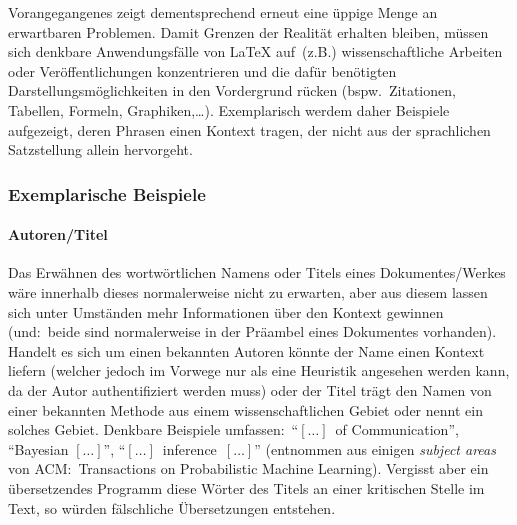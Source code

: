 Vorangegangenes zeigt dementsprechend erneut eine üppige Menge an erwartbaren Problemen. Damit Grenzen der Realität erhalten bleiben, %
müssen sich denkbare Anwendungsfälle von \LaTeX{} auf\ (z.B.) wissenschaftliche Arbeiten oder Veröffentlichungen konzentrieren und die dafür benötigten Darstellungsmöglichkeiten in den Vordergrund rücken (bspw.\ Zitationen, Tabellen, Formeln, Graphiken,\ldots).%
Exemplarisch werdem daher Beispiele aufgezeigt, deren Phrasen einen Kontext tragen, der nicht aus der sprachlichen Satzstellung allein hervorgeht. 



\subsubsection{Exemplarische Beispiele}
\paragraph*{Autoren/Titel}%
%
%
%
Das Erwähnen des wortwörtlichen Namens oder Titels eines Dokumentes/Werkes wäre innerhalb dieses normalerweise nicht zu erwarten, aber aus diesem lassen sich unter Umständen mehr Informationen über den Kontext gewinnen (und:\ beide sind normalerweise in der Präambel eines Dokumentes vorhanden). Handelt es sich um einen bekannten Autoren könnte der Name einen Kontext liefern (welcher jedoch im Vorwege nur als eine Heuristik angesehen werden kann, da der Autor authentifiziert werden muss) oder der Titel trägt den Namen von einer bekannten Methode aus einem wissenschaftlichen Gebiet oder nennt ein solches Gebiet. Denkbare Beispiele umfassen:\ 
\enquote{$[\ldots]$\ of Communication}, \enquote{Bayesian $[\ldots]$}, \enquote{$[\ldots]$\ inference\ $[\ldots]$}
(entnommen aus einigen \textit{subject areas} von ACM:\ Transactions on Probabilistic Machine Learning).
Vergisst aber ein übersetzendes Programm diese Wörter des Titels an einer kritischen Stelle im Text, so würden fälschliche Übersetzungen entstehen.

